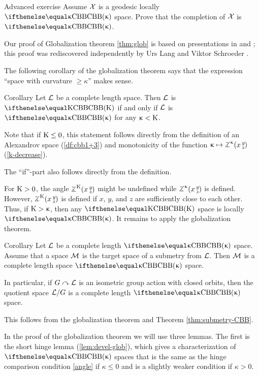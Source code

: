 \begin{thm}{Advanced exercise}\label{ex:noncomplete-globalization}
Assume $\mathcal{X}$ is a geodesic locally  $\Alex\kappa$ space. 
Prove that the completion of $\mathcal{X}$ is $\Alex\kappa$.
\end{thm}

Our proof of Globalization theorem \ref{thm:glob} is based on presentations in \cite{plaut:dimension} and \cite{burago-burago-ivanov};
this proof was rediscovered independently by Urs Lang and Viktor Schroeder \cite{lang-schroeder:globalization}.

The following corollary of the globalization  theorem says that the expression ``space with curvature $\ge \kappa$'' makes sense.

\begin{thm}{Corollary}\label{cor:CAT>k-sence}
Let $\mathcal{L}$ be a complete length space.
Then $\mathcal{L}$ is $\Alex\Kappa$ if and only if $\mathcal{L}$ is $\Alex\kappa$ for any $\upkappa<\mathrm{K}$.
\end{thm}

Note that if $\Kappa\le 0$, this statement follows directly from the  definition of an Alexandrov space (\ref{df:cbb1+3}) and monotonicity of the function $\kappa\mapsto\angk\kappa x y z$ (\ref{k-decrease}).

The ``if''-part also follows directly from the definition.

For $\mathrm{K}>0$, the angle $\angk{\Kappa} x y z$ might be undefined while $\angk{\kappa} x y z$ is defined.
However, $\angk{\Kappa} x y z$ is defined if $x$, $y$, and $z$ are sufficiently close to each other.
Thus, if $\mathrm{K}>\upkappa$, then any $\Alex\Kappa$ space is locally $\Alex\kappa$.
It remains to apply the  globalization theorem.
\qeds

\begin{thm}{Corollary}\label{cor:submetry-cbb}
Let $\mathcal{L}$ be a complete length $\Alex\kappa$ space.
Assume that a space  $\mathcal{M}$ is the target space of a submetry from $\mathcal{L}$.
Then $\mathcal{M}$ is a complete length space $\Alex\kappa$ space.

In particular, if $G\curvearrowright \mathcal{L}$ is an isometric group action with closed orbits, then the quotient space $\mathcal{L}/G$ is a complete length $\Alex\kappa$ space.
\end{thm}

This follows from the globalization theorem and Theorem \ref{thm:submetry-CBB}.
\qeds

In the proof of the globalization theorem 
we will use three lemmas.
The first is the short hinge lemma (\ref{lem:devel-glob}), which gives a characterization of $\Alex\kappa$ spaces that is the same as the hinge comparison condition \ref{angle} if $\kappa\le 0$ and is a slightly weaker condition if  $\kappa>0$.

